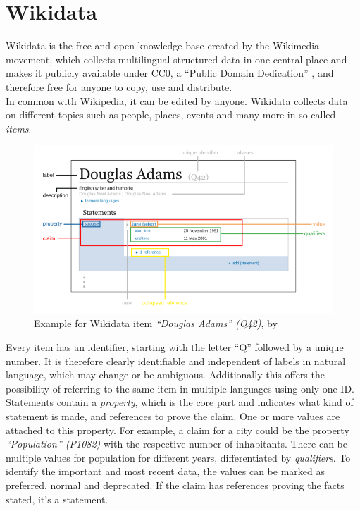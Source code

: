 \section{Wikidata}

Wikidata is the free and open knowledge base created by the Wikimedia movement, which collects multilingual structured data in one central place and makes it publicly available under CC0, a ``Public Domain Dedication'' \citep{cc0}, and therefore free for anyone to copy, use and distribute. \\
In common with Wikipedia, it can be edited by anyone. Wikidata collects data on different topics such as people, places, events and many more in so called \textit{items}.
\begin{figure}[H]
	\centering
	\includegraphics[width=\textwidth]{diagrams/Wikidata_statement.png}
	\caption{Example for Wikidata item \textit{``Douglas Adams'' (Q42)}, by \citet{kritschmar}}
	\label{diagramWikidataStatement}
\end{figure}
Every item has an identifier, starting with the letter ``Q'' followed by a unique number. It is therefore clearly identifiable and independent of labels in natural language, which may change or be ambiguous. Additionally this offers the possibility of referring to the same item in multiple languages using only one ID. \\
Statements contain a \textit{property}, which is the core part and indicates what kind of statement is made, and references to prove the claim. One or more values are attached to this property. For example, a claim for a city could be the property \textit{``Population'' (P1082)} with the respective number of inhabitants. There can be multiple values for population for different years, differentiated by \textit{qualifiers}. To identify the important and most recent data, the values can be marked as preferred, normal and deprecated. If the claim has references proving the facts stated, it's a statement. \\
